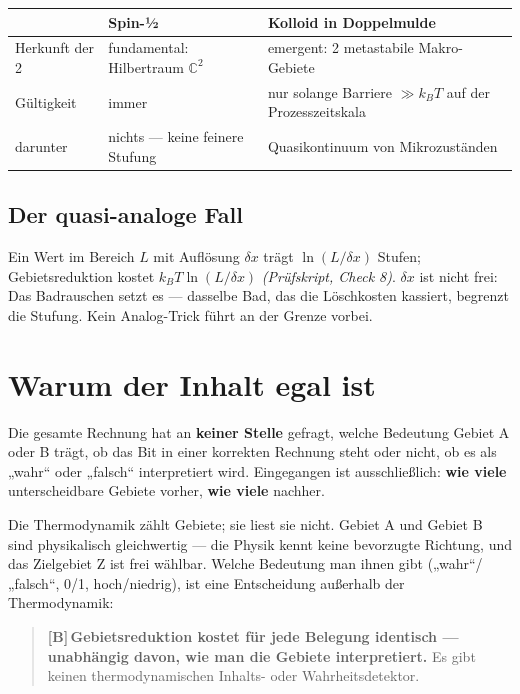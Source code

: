 \documentclass[11pt,a4paper]{article}
\newcommand{\LB}{\textcolor{layB}{\textbf{\footnotesize\textsf{[B]}}}\,}
\newcommand{\pruef}[1]{{\small\itshape(Prüfskript, #1)}}
\begin{document}
\begin{center}
\small
\begin{tabular}{@{}p{}p{}p{}@{}}
\toprule
 & \textbf{Spin-½} & \textbf{Kolloid in Doppelmulde} \\
\midrule
Herkunft der 2 & fundamental: Hilbertraum $\mathbb{C}^2$ & emergent: 2 metastabile Makro-Gebiete \\
Gültigkeit & immer & nur solange Barriere $\gg k_B T$ auf der Prozesszeitskala \\
darunter & nichts --- keine feinere Stufung & Quasikontinuum von Mikrozuständen \\
\bottomrule
\end{tabular}
\end{center}

\subsection{Der quasi-analoge Fall}

Ein Wert im Bereich $L$ mit Auflösung $\delta x$ trägt $\ln(L/\delta x)$ Stufen;
Gebietsreduktion kostet $k_B T \ln(L/\delta x)$ \pruef{Check 8}. $\delta x$ ist
nicht frei: Das Badrauschen setzt es --- dasselbe Bad, das die Löschkosten
kassiert, begrenzt die Stufung. Kein Analog-Trick führt an der Grenze vorbei.

\section{Warum der Inhalt egal ist}
\label{sec:inhalt}

Die gesamte Rechnung hat an \textbf{keiner Stelle} gefragt, welche Bedeutung
Gebiet A oder B trägt, ob das Bit in einer korrekten Rechnung steht oder nicht, ob
es als „wahr“ oder „falsch“ interpretiert wird. Eingegangen ist ausschließlich:
\textbf{wie viele} unterscheidbare Gebiete vorher, \textbf{wie viele} nachher.

Die Thermodynamik zählt Gebiete; sie liest sie nicht. Gebiet A und Gebiet B sind
physikalisch gleichwertig --- die Physik kennt keine bevorzugte Richtung, und das
Zielgebiet Z ist frei wählbar. Welche Bedeutung man ihnen gibt („wahr“/„falsch“,
0/1, hoch/niedrig), ist eine Entscheidung außerhalb der Thermodynamik:

\begin{quote}
\LB \textbf{Gebietsreduktion kostet für jede Belegung identisch --- unabhängig
davon, wie man die Gebiete interpretiert.} Es gibt keinen thermodynamischen
Inhalts- oder Wahrheitsdetektor.
\end{quote}
\end{document}
